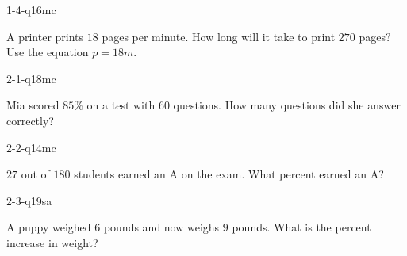 
\begin{practiceQuestion}{1-4-q16}{mc}
\begin{questionText}
A printer prints $18$ pages per minute. How long will it take to print $270$ pages? Use the equation $p = 18m$.
\end{questionText}
\end{practiceQuestion}

\begin{practiceQuestion}{2-1-q18}{mc}
\begin{questionText}
Mia scored $85\%$ on a test with $60$ questions. How many questions did she answer correctly?
\end{questionText}
\end{practiceQuestion}

\begin{practiceQuestion}{2-2-q14}{mc}
\begin{questionText}
$27$ out of $180$ students earned an A on the exam. What percent earned an A?
\end{questionText}
\end{practiceQuestion}

\begin{practiceQuestion}{2-3-q19}{sa}
\begin{questionText}
A puppy weighed $6$ pounds and now weighs $9$ pounds. What is the percent increase in weight?


\end{questionText}
\end{practiceQuestion}

